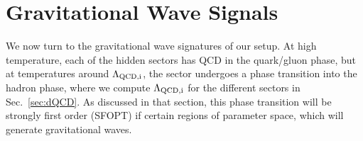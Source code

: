 \documentclass[nofootinbib,twocolumn,preprintnumbers]{revtex4-1}
\begin{document}
\section{Gravitational Wave Signals}



\label{sec:gw}

We now turn to the gravitational wave signatures of our setup. At high temperature, each of the hidden sectors has QCD in the quark/gluon phase, but at temperatures around $\Lambda_{\rm QCD,i}$, the sector undergoes a phase transition into the hadron phase, where we compute $\Lambda_{\rm QCD,i}$ for the different sectors in Sec.~\ref{sec:dQCD}. As discussed in that section, this phase transition will be strongly first order (SFOPT) if certain regions of parameter space, which will generate gravitational waves. 


\end{document}
